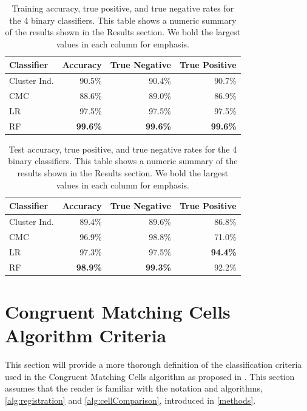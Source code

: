 \documentclass[reprint]{JASA}
\begin{document}
\begin{appendices}
\begin{table}[htbp]
    \centering
    \begin{tabular}{l|r|r|r}
         \textbf{Classifier} & \textbf{Accuracy} & \textbf{True Negative} & \textbf{True Positive} \\
         \hline
         Cluster Ind. & 90.5\% & 90.4\% & 90.7\% \\
         CMC & 88.6\% & 89.0\% & 86.9\% \\
         \hline
         LR & 97.5\% & 97.5\% & 97.5\% \\
         RF & \textbf{99.6\%} & \textbf{99.6\%} & \textbf{99.6\%}
    \end{tabular}
    \caption{Training accuracy, true positive, and true negative rates for the 4 binary classifiers. This table shows a numeric summary of the results shown in the Results section. We bold the largest values in each column for emphasis.}
    \label{tab:trainDataResults}
\end{table}

\begin{table}[htbp]
    \centering
    \begin{tabular}{l|r|r|r}
         \textbf{Classifier} & \textbf{Accuracy} & \textbf{True Negative} & \textbf{True Positive} \\
         \hline
         Cluster Ind. & 89.4\% & 89.6\% & 86.8\% \\
         CMC & 96.9\% & 98.8\% & 71.0\% \\
         \hline
         LR & 97.3\% & 97.5\% & \textbf{94.4\%} \\
         RF & \textbf{98.9\%} & \textbf{99.3\%} & 92.2\%
    \end{tabular}
    \caption{Test accuracy, true positive, and true negative rates for the 4 binary classifiers. This table shows a numeric summary of the results shown in the Results section. We bold the largest values in each column for emphasis.}
    \label{tab:testDataResults}
\end{table}

\section{Congruent Matching Cells Algorithm Criteria} \label{appendixCMC}

This section will provide a more thorough definition of the classification criteria used in the Congruent Matching Cells algorithm as proposed in \citet{song_proposed_2013}.
This section assumes that the reader is familiar with the notation and algorithms, \autoref{alg:registration} and \autoref{alg:cellComparison}, introduced in \ref{methods}.

\end{appendices}
\end{document}

